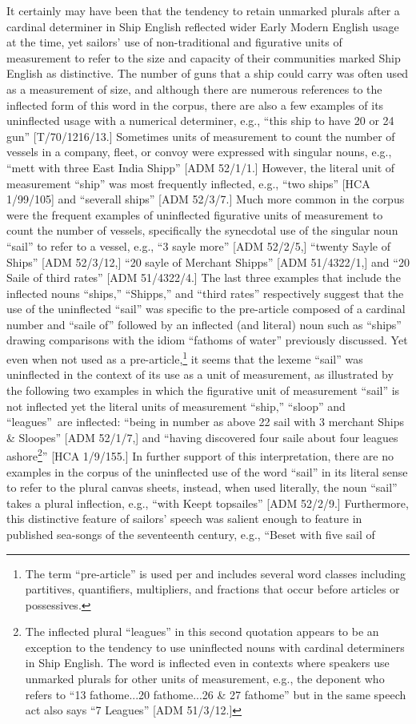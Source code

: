 It certainly may have been that the tendency to retain unmarked plurals after a cardinal determiner in Ship English reflected wider Early Modern English usage at the time, yet sailors’ use of non-traditional and figurative units of measurement to refer to the size and capacity of their communities marked Ship English as distinctive. The number of guns that a ship could carry was often used as a measurement of size, and although there are numerous references to the inflected form of this word in the corpus, there are also a few examples of its uninflected usage with a numerical determiner, e.g., “this ship to have 20 or 24 gun” [T/70/1216/13.] Sometimes units of measurement to count the number of vessels in a company, fleet, or convoy were expressed with singular nouns, e.g., “mett with three East India Shipp” [ADM 52/1/1.] However, the literal unit of measurement “ship” was most frequently inflected, e.g., “two ships” [HCA 1/99/105] and “severall ships” [ADM 52/3/7.] Much more common in the corpus were the frequent examples of uninflected figurative units of measurement to count the number of vessels, specifically the synecdotal use of the singular noun “sail” to refer to a vessel, e.g., “3 sayle more” [ADM 52/2/5,] “twenty Sayle of Ships” [ADM 52/3/12,] “20 sayle of Merchant Shipps” [ADM 51/4322/1,] and “20 Saile of third rates” [ADM 51/4322/4.] The last three examples that include the inflected nouns “ships,” “Shipps,” and “third rates” respectively suggest that the use of the uninflected “sail” was specific to the pre-article composed of a cardinal number and “saile of” followed by an inflected (and literal) noun such as “ships” drawing comparisons with the idiom “fathoms of water” previously discussed. Yet even when not used as a pre-article,\footnote{The term “pre-article” is used per \citet[76]{Morenberg2010} and includes several word classes including partitives, quantifiers, multipliers, and fractions that occur before articles or possessives.} it seems that the lexeme “sail” was uninflected in the context of its use as a unit of measurement, as illustrated by the following two examples in which the figurative unit of measurement “sail” is not inflected yet the literal units of measurement “ship,” “sloop” and “leagues”~are inflected: “being in number as above 22 sail with 3 merchant Ships \& Sloopes” [ADM 52/1/7,] and “having discovered four saile about four leagues ashore\footnote{The inflected plural “leagues” in this second quotation appears to be an exception to the tendency to use uninflected nouns with cardinal determiners in Ship English. The word is inflected even in contexts where speakers use unmarked plurals for other units of measurement, e.g., the deponent who refers to “13 fathome...20 fathome...26 \& 27 fathome” but in the same speech act also says “7 Leagues” [ADM 51/3/12.]}” [HCA 1/9/155.] In further support of this interpretation, there are no examples in the corpus of the uninflected use of the word “sail” in its literal sense to refer to the plural canvas sheets, instead, when used literally, the noun “sail” takes a plural inflection, e.g., “with Keept topsailes” [ADM 52/2/9.] Furthermore, this distinctive feature of sailors’ speech was salient enough to feature in published sea-songs of the seventeenth century, e.g., “Beset with five sail of 